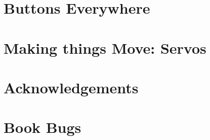 \documentclass[a5paper,oneside]{scrbook}
\begin{document}
\chapter{Buttons Everywhere\label{ch6}}


\chapter{Making things Move: Servos\label{ch7}}



%

\chapter{Acknowledgements\label{acknowledgements}}


\chapter{Book Bugs\label{bugs}}

\end{document}
